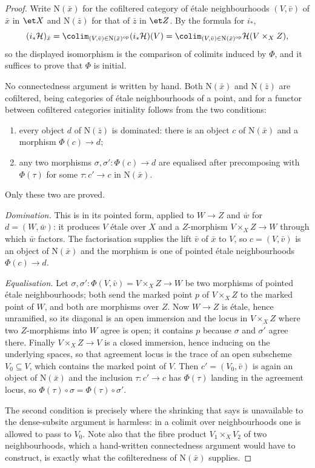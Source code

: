 \begin{proof}
\leanok
Write $\mathrm N(\bar x)$ for the cofiltered category of \'etale
neighbourhoods $(V,\bar v)$ of $\bar x$ in $\et X$ and $\mathrm N(\bar z)$
for that of $\bar z$ in $\et Z$.  By the formula for $i_*$,
\[
  (i_*\mathcal H)_{\bar x}
  =\colim_{(V,\bar v)\in\mathrm N(\bar x)^{\mathrm{op}}}(i_*\mathcal H)(V)
  =\colim_{(V,\bar v)\in\mathrm N(\bar x)^{\mathrm{op}}}
     \mathcal H(V\times_XZ),
\]
so the displayed isomorphism is the comparison of colimits induced by
$\Phi$, and it suffices to prove that $\Phi$ is initial.

No connectedness argument is written by hand.  Both $\mathrm N(\bar x)$ and
$\mathrm N(\bar z)$ are cofiltered, being categories of \'etale
neighbourhoods of a point, and for a functor between cofiltered categories
initiality follows from the two conditions:
\begin{enumerate}
\item every object $d$ of $\mathrm N(\bar z)$ is dominated: there is an object
      $c$ of $\mathrm N(\bar x)$ and a morphism $\Phi(c)\to d$;
\item any two morphisms $\sigma,\sigma'\colon\Phi(c)\to d$ are equalised
      after precomposing with $\Phi(\tau)$ for some
      $\tau\colon c'\to c$ in $\mathrm N(\bar x)$.
\end{enumerate}
Only these two are proved.

\emph{Domination.}  This is  in its
pointed form, applied to $W\to Z$ and $\bar w$ for $d=(W,\bar w)$: it produces
$V$ \'etale over $X$ and a $Z$-morphism $V\times_XZ\to W$ through which
$\bar w$ factors.  The factorisation supplies the lift $\bar v$ of $\bar x$ to
$V$, so $c=(V,\bar v)$ is an object of $\mathrm N(\bar x)$ and the morphism is
one of pointed \'etale neighbourhoods $\Phi(c)\to d$.

\emph{Equalisation.}  Let $\sigma,\sigma'\colon\Phi(V,\bar v)=V\times_XZ\to W$
be two morphisms of pointed \'etale neighbourhoods; both send the marked point
$p$ of $V\times_XZ$ to the marked point of $W$, and both are morphisms over
$Z$.  Now $W\to Z$ is \'etale, hence unramified, so its diagonal is an open
immersion and the locus in $V\times_XZ$ where two $Z$-morphisms into $W$ agree
is open; it contains $p$ because $\sigma$ and $\sigma'$ agree there.  Finally
$V\times_XZ\to V$ is a closed immersion, hence inducing on the underlying
spaces, so that agreement locus is the trace of an open subscheme
$V_0\subseteq V$, which contains the marked point of $V$.  Then
$c'=(V_0,\bar v)$ is again an object of $\mathrm N(\bar x)$ and the inclusion
$\tau\colon c'\to c$ has $\Phi(\tau)$ landing in the agreement locus, so
$\Phi(\tau)\circ\sigma=\Phi(\tau)\circ\sigma'$.

The second condition is precisely where the shrinking that
 says is unavailable to the
dense-subsite argument is harmless: in a colimit over neighbourhoods one is
allowed to pass to $V_0$.  Note also that the fibre product $V_1\times_XV_2$ of
two neighbourhoods, which a hand-written connectedness argument would have to
construct, is exactly what the cofilteredness of $\mathrm N(\bar x)$ supplies.
\end{proof}

